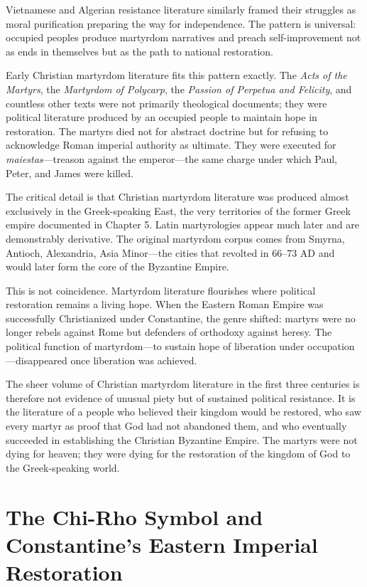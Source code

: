 Vietnamese and Algerian resistance literature similarly framed their struggles as moral purification preparing the way for independence.
The pattern is universal: occupied peoples produce martyrdom narratives and preach self-improvement not as ends in themselves but as the path to national restoration.

Early Christian martyrdom literature fits this pattern exactly.
The \emph{Acts of the Martyrs}, the \emph{Martyrdom of Polycarp}, the \emph{Passion of Perpetua and Felicity}, and countless other texts were not primarily theological documents; they were political literature produced by an occupied people to maintain hope in restoration.
The martyrs died not for abstract doctrine but for refusing to acknowledge Roman imperial authority as ultimate.
They were executed for \emph{maiestas}---treason against the emperor---the same charge under which Paul, Peter, and James were killed.

The critical detail is that Christian martyrdom literature was produced almost exclusively in the Greek-speaking East, the very territories of the former Greek empire documented in Chapter 5.
Latin martyrologies appear much later and are demonstrably derivative.
The original martyrdom corpus comes from Smyrna, Antioch, Alexandria, Asia Minor---the cities that revolted in 66--73 AD and would later form the core of the Byzantine Empire.

This is not coincidence.
Martyrdom literature flourishes where political restoration remains a living hope.
When the Eastern Roman Empire was successfully Christianized under Constantine, the genre shifted: martyrs were no longer rebels against Rome but defenders of orthodoxy against heresy.
The political function of martyrdom---to sustain hope of liberation under occupation---disappeared once liberation was achieved.

The sheer volume of Christian martyrdom literature in the first three centuries is therefore not evidence of unusual piety but of sustained political resistance.
It is the literature of a people who believed their kingdom would be restored, who saw every martyr as proof that God had not abandoned them, and who eventually succeeded in establishing the Christian Byzantine Empire.
The martyrs were not dying for heaven; they were dying for the restoration of the kingdom of God to the Greek-speaking world.

\section{The Chi-Rho Symbol and Constantine's Eastern Imperial Restoration}\label{sec:chi-rho-constantinan-restoration}

